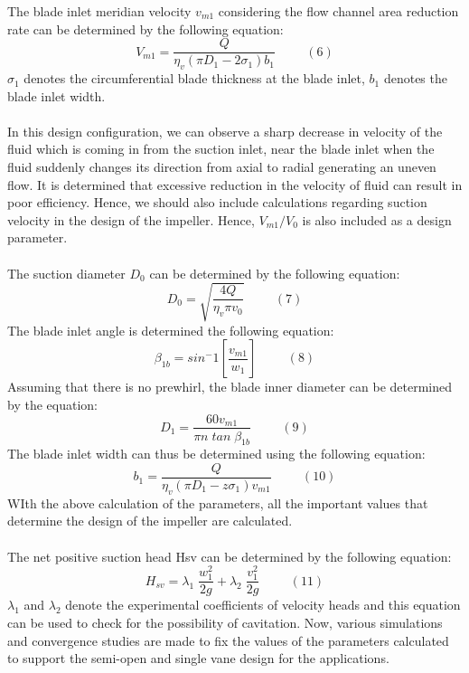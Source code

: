 \documentclass[11pt,a4paper]{scrartcl}
\begin{document}
 The blade inlet meridian velocity $v_{m1}$ considering the flow channel area reduction rate can be determined by the following equation:
$$V_{m1}=\frac{Q}{\eta_v({\pi}D_1-2\sigma_1)b_1}\hspace{1cm}(6)$$
$\sigma_1$ denotes the circumferential blade thickness at the blade inlet, $b_1$ denotes the blade inlet width. 
\paragraph{}

In this design configuration, we can observe a sharp decrease in velocity of the fluid which is coming in from the suction inlet, near the blade inlet when the fluid suddenly changes its direction from axial to radial generating an uneven flow. It is determined that excessive reduction in the velocity of fluid can result in poor efficiency. Hence, we should also include calculations regarding suction velocity in the design of the impeller. Hence, $V_{m1}/V_0$ is also included as a design parameter.
\paragraph{}
The suction diameter $D_0$ can be determined by the following equation:
$$D_0=\sqrt{\frac{4Q}{\eta_v{\pi}v_0}}\hspace{1cm}(7)$$
The blade inlet angle is determined the following equation:
$$\beta_{1b}=sin^-1\left[\frac{v_{m1}}{w_1}\right]\hspace{1cm}(8)$$
Assuming that there is no prewhirl, the blade inner diameter can be determined by the equation:
$$D_1=\frac{60v_{m1}}{{\pi}n\;tan\;\beta_{1b}}\hspace{1cm}(9)$$
The blade inlet width can thus be determined using the following equation:
$$b_1=\frac{Q}{\eta_v({\pi}D_1-z\sigma_1)v_{m1}}\hspace{1cm}(10)$$
WIth the above calculation of the parameters, all the important values that determine the design of the impeller are calculated. 
\paragraph{}
The net positive suction head Hsv can be determined by the following equation:
$$H_{sv}=\lambda_1\;\frac{w^2_{1}}{2g}+\lambda_2\;\frac{v^2_1}{2g}\hspace{1cm}(11)$$
$\lambda_1$ and $\lambda_2$ denote the experimental coefficients of velocity heads and this equation can be used to check for the possibility of cavitation. Now, various simulations and convergence studies are made to fix the values of the parameters calculated to support the semi-open and single vane design for the applications.
\end{document}
